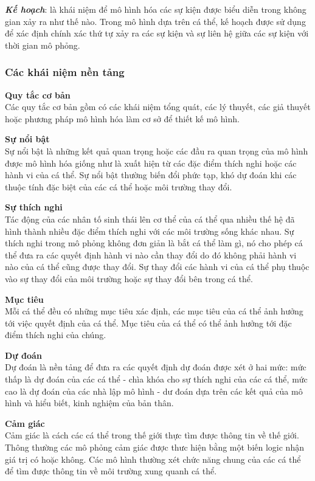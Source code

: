 \documentclass[13pt]{extreport}
\begin{document}
\textit{\textbf{Kế hoạch}}: là khái niệm để mô hình hóa các sự kiện được biểu diễn trong không gian xảy ra như thế nào. Trong mô hình dựa trên cá thể, kế hoạch được sử dụng để xác định chính xác thứ tự xảy ra các sự kiện và sự liên hệ giữa các sự kiện với thời gian mô phỏng.

\subsubsection{Các khái niệm nền tảng}
\textbf{\indent Quy tắc cơ bản}\\
Các quy tắc cơ bản gồm có các khái niệm tổng quát, các lý thuyết, các giả thuyết hoặc phương pháp mô hình hóa làm cơ sở để thiết kế mô hình.

\textbf{Sự nổi bật}\\
Sự nổi bật là những kết quả quan trọng hoặc các đầu ra quan trọng của mô hình được mô hình hóa giống như là xuất hiện từ các đặc điểm thích nghi hoặc các hành vi của cá thể. Sự nổi bật thường biến đổi phức tạp, khó dự đoán khi các thuộc tính đặc biệt của các cá thể hoặc môi trường thay đổi.

\textbf{Sự thích nghi}\\
Tác động của các nhân tố sinh thái lên cơ thể của cá thể qua nhiều thế hệ đã hình thành nhiều đặc điểm thích nghi với các môi trường sống khác nhau. Sự thích nghi trong mô phỏng không đơn giản là bắt cá thể làm gì, nó cho phép cá thể đưa ra các quyết định hành vi nào cần thay đổi do đó không phải hành vi nào của cá thể cũng được thay đổi. Sự thay đổi các hành vi của cá thể phụ thuộc vào sự thay đổi của môi trường hoặc sự thay đổi bên trong cá thể.

\textbf{Mục tiêu}\\
Mỗi cá thể đều có những mục tiêu xác định, các mục tiêu của cá thể ảnh hưởng tới việc quyết định của cá thể. Mục tiêu của cá thể có thể ảnh hưởng tới đặc điểm thích nghi của chúng.

\textbf{Dự đoán}\\
Dự đoán là nền tảng để đưa ra các quyết định dự đoán được xét ở hai mức: mức thấp là dự đoán của các cá thể - chìa khóa cho sự thích nghi của các cá thể, mức cao là dự đoán của các nhà lập mô hình - dư đoán dựa trên các kết quả của mô hình và hiểu biết, kinh nghiệm của bản thân.

\textbf{Cảm giác}\\
Cảm giác là cách các cá thể trong thế giới thực tìm được thông tin về thế giới. Thông thường các mô phỏng cảm giác được thưc hiện bằng một biến logic nhận giá trị có hoặc không. Các mô hình thường xét chức năng chung của các cá thể để tìm được thông  tin về môi trường xung quanh cá thể.
\end{document}
